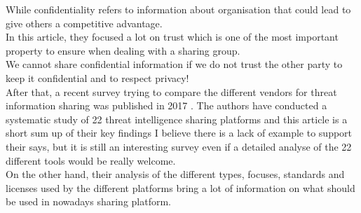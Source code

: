 \documentclass{eplmastersthesis}
\begin{document}
While confidentiality refers to information about organisation that could lead to give others a competitive advantage.\\
In this article, they focused a lot on trust which is one of the most important property to ensure when dealing with a sharing group.\\
We cannot share confidential information if we do not trust the other party to keep it confidential and to respect privacy! \\

After that, a recent survey trying to compare the different vendors for threat information sharing was published in 2017 \cite{sauerwein2017threat}. The authors have conducted a systematic study of 22 threat intelligence sharing platforms and this article is a short sum up of their key findings I believe there is a lack of example to support their says, but it is still an interesting survey even if a detailed analyse of the 22 different tools would be really welcome.\\
On the other hand, their analysis of the different types, focuses, standards and licenses used by the different platforms bring a lot of information on what should be used in nowadays sharing platform.\\
\end{document}
